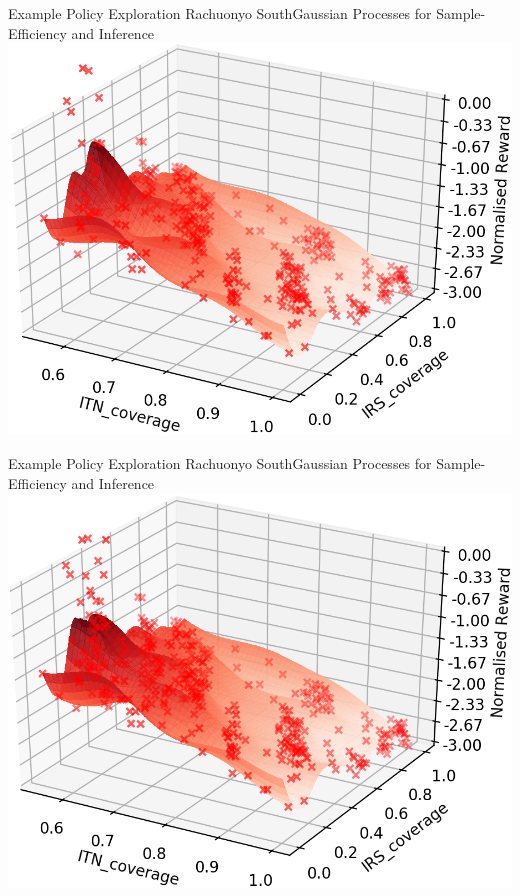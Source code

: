 \documentclass{beamer}
\begin{document}
\begin{frame}{Example Policy Exploration Rachuonyo South}{Gaussian Processes for Sample-Efficiency and Inference}
\centering
\includegraphics[width=1\textheight]{images/Batch_5.png}
\end{frame}
\begin{frame}{Example Policy Exploration Rachuonyo South}{Gaussian Processes for Sample-Efficiency and Inference}
\centering
\includegraphics[width=1\textheight]{images/Batch_6.png}
\end{frame}
\end{document}
